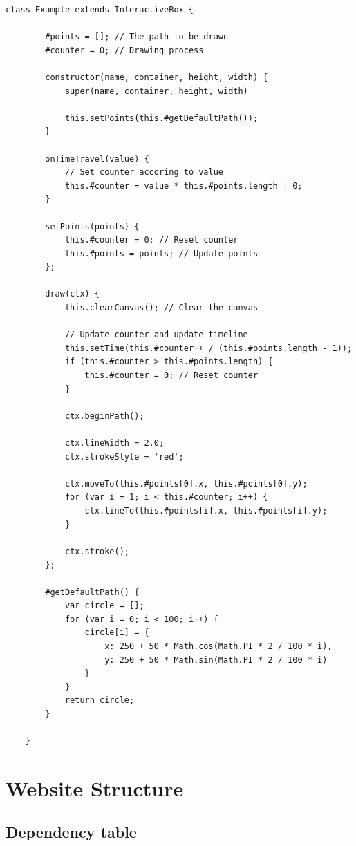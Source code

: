 \documentclass{article}
\begin{document}
\begin{lstlisting}[style=js]
    class Example extends InteractiveBox {

        #points = []; // The path to be drawn
        #counter = 0; // Drawing process

        constructor(name, container, height, width) {
            super(name, container, height, width)

            this.setPoints(this.#getDefaultPath());
        }

        onTimeTravel(value) {
            // Set counter accoring to value
            this.#counter = value * this.#points.length | 0;
        }

        setPoints(points) {
            this.#counter = 0; // Reset counter
            this.#points = points; // Update points
        };

        draw(ctx) {
            this.clearCanvas(); // Clear the canvas
            
            // Update counter and update timeline
            this.setTime(this.#counter++ / (this.#points.length - 1));
            if (this.#counter > this.#points.length) {
                this.#counter = 0; // Reset counter
            }

            ctx.beginPath();
            
            ctx.lineWidth = 2.0;
            ctx.strokeStyle = 'red';

            ctx.moveTo(this.#points[0].x, this.#points[0].y);
            for (var i = 1; i < this.#counter; i++) {
                ctx.lineTo(this.#points[i].x, this.#points[i].y);
            }

            ctx.stroke();
        };

        #getDefaultPath() {
            var circle = [];
            for (var i = 0; i < 100; i++) {
                circle[i] = {
                    x: 250 + 50 * Math.cos(Math.PI * 2 / 100 * i),
                    y: 250 + 50 * Math.sin(Math.PI * 2 / 100 * i)
                }
            }
            return circle;
        }

    }
\end{lstlisting}

\pagebreak

\section{Website Structure}

\subsection{Dependency table}
\end{document}
